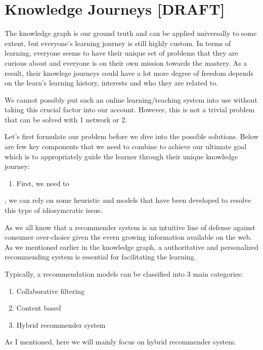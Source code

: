 \documentclass[]{book}
\providecommand{\tightlist}{%
  \setlength{\itemsep}{0pt}\setlength{\parskip}{0pt}}
\theoremstyle{definition}
\theoremstyle{definition}
\theoremstyle{definition}
\theoremstyle{remark}
\begin{document}
\section{Knowledge Journeys {[}DRAFT{]}}\label{knowledge-journeys-draft}

The knowledge graph is our ground truth and can be applied universally
to some extent, but everyone's learning journey is still highly custom.
In terms of learning, everyone seems to have their unique set of
problems that they are curious about and everyone is on their own
mission towards the mastery. As a result, their knowlege journeys could
have a lot more degree of freedom depends on the learn's learning
history, interests and who they are related to.

We cannot possibly put such an online learning/teaching system into use
without taking this crucial factor into our account. However, this is
not a trivial problem that can be solved with 1 network or 2.

Let's first formulate our problem before we dive into the possible
solutions. Below are few key components that we need to combine to
achieve our ultimate goal which is to appropriately guide the learner
through their unique knowledge journey:

\begin{enumerate}
\def\labelenumi{\arabic{enumi}.}
\tightlist
\item
  First, we need to
\end{enumerate}

, we can rely on some heuristic and models that have been developed to
resolve this type of idiosymcratic issue.

As we all know that a recommender system is an intuitive line of defense
against consumer over-choice given the evern growing information
available on the web. As we mentioned earlier in the knowledge graph, a
authoritative and personalized recommending system is essential for
facilitating the learning.

Typically, a recommendation models can be classified into 3 main
categories:

\begin{enumerate}
\def\labelenumi{\arabic{enumi}.}
\item
  Collaborative filtering
\item
  Content based
\item
  Hybrid recommender system
\end{enumerate}

As I mentioned, here we will mainly focus on hybrid recommender system.
\end{document}
